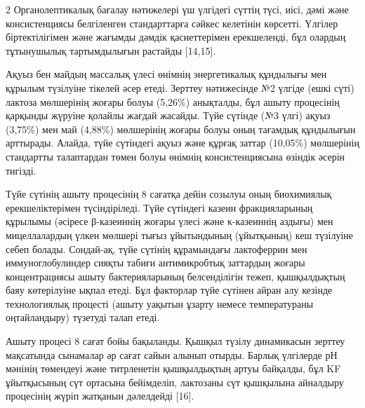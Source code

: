 \begin{multicols}{2}
Органолептикалық бағалау нәтижелері үш үлгідегі сүттің түсі, иісі, дәмі
және консистенциясы белгіленген стандарттарға сәйкес келетінін көрсетті.
Үлгілер біртектілігімен және жағымды дәмдік қасиеттерімен ерекшеленді,
бұл олардың тұтынушылық тартымдылығын растайды {[}14,15{]}.

Ақуыз бен майдың массалық үлесі өнімнің энергетикалық құндылығы мен
құрылым түзілуіне тікелей әсер етеді. Зерттеу нәтижесінде №2 үлгіде
(ешкі сүті) лактоза мөлшерінің жоғары болуы (5,26\%) анықталды, бұл
ашыту процесінің қарқынды жүруіне қолайлы жағдай жасайды. Түйе сүтінде
(№3 үлгі) ақуыз (3,75\%) мен май (4,88\%) мөлшерінің жоғары болуы оның
тағамдық құндылығын арттырады. Алайда, түйе сүтіндегі ақуыз және құрғақ
заттар (10,05\%) мөлшерінің стандартты талаптардан төмен болуы өнімнің
консистенциясына өзіндік әсерін тигізді.

Түйе сүтінің ашыту процесінің 8 сағатқа дейін созылуы оның биохимиялық
ерекшеліктерімен түсіндіріледі. Түйе сүтіндегі казеин фракцияларының
құрылымы (әсіресе β-казеиннің жоғары үлесі және κ-казеиннің аздығы) мен
мицеллалардың үлкен мөлшері тығыз ұйытындының (ұйытқының) кеш түзілуіне
себеп болады. Сондай-ақ, түйе сүтінің құрамындағы лактоферрин мен
иммуноглобулиндер сияқты табиғи антимикробтық заттардың жоғары
концентрациясы ашыту бактерияларының белсенділігін тежеп, қышқылдықтың
баяу көтерілуіне ықпал етеді. Бұл факторлар түйе сүтінен айран алу
кезінде технологиялық процесті (ашыту уақытын ұзарту немесе
температураны оңтайландыру) түзетуді талап етеді.

Ашыту процесі 8 сағат бойы бақыланды. Қышқыл түзілу динамикасын зерттеу
мақсатында сынамалар әр сағат сайын алынып отырды. Барлық үлгілерде рН
мәнінің төмендеуі және титрленетін қышқылдықтың артуы байқалды, бұл KF
ұйытқысының сүт ортасына бейімделіп, лактозаны сүт қышқылына айналдыру
процесінің жүріп жатқанын дәлелдейді {[}16{]}.
\end{multicols}

